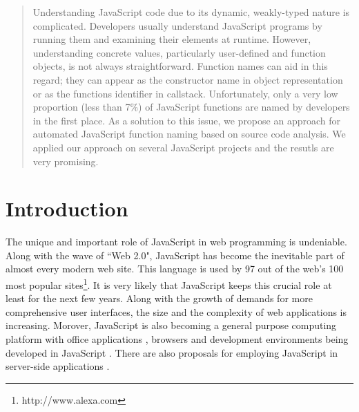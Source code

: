 \documentclass{acm_proc_article-sp}
\begin{document}
\maketitle
\begin{abstract}
Understanding JavaScript code due to its dynamic, weakly-typed nature is complicated. Developers usually understand JavaScript programs by running them and examining their elements at runtime. However, understanding concrete values, particularly user-defined and function objects, is not always straightforward. Function names can aid in this regard; they can appear as the constructor name in object representation or as the functions identifier in callstack. Unfortunately, only a very low proportion (less than 7\%) of JavaScript functions are named by developers in the first place. As a solution to this issue, we propose an approach for automated JavaScript function naming based on source code analysis. We applied our approach on several JavaScript projects and the resutls are very promising.

\end{abstract}




\section{Introduction}
The unique and important role of JavaScript in web programming is undeniable. Along with the wave of ``Web 2.0", JavaScript has become the inevitable part of almost every modern web site. This language is used by 97 out of the web's 100 most popular sites\footnote[1]{http://www.alexa.com}. It is very likely that JavaScript keeps this crucial role at least for the next few years. Along with the growth of demands for more comprehensive user interfaces, the size and the complexity of web applications is increasing. Morover, JavaScript is also becoming a general purpose computing platform with office applications \cite{JSOffice, JSOffice2}, browsers \cite{FAO, GCE} and development environments \cite{Ingalls} being developed in JavaScript \cite{Richards}. There are also proposals for employing JavaScript in server-side applications \cite{SSJSR, CJS}.
\end{document}
